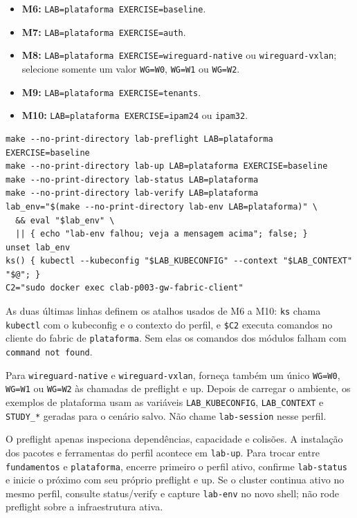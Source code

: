 \documentclass[12pt,openany,oneside,a4paper,chapter=TITLE,english,brazil]{abntex2}
\providecommand{\tightlist}{\setlength{\itemsep}{0pt}\setlength{\parskip}{0pt}}
\begin{document}
\begin{apendicesenv}
\begin{itemize}
\tightlist
\item
  \textbf{M6:} \texttt{LAB=\allowbreak{}plataforma EXERCISE=\allowbreak{}baseline}.
\item
  \textbf{M7:} \texttt{LAB=\allowbreak{}plataforma EXERCISE=\allowbreak{}auth}.
\item
  \textbf{M8:} \texttt{LAB=\allowbreak{}plataforma EXERCISE=\allowbreak{}wireguard-{}\allowbreak{}native} ou \texttt{wireguard-{}\allowbreak{}vxlan}; selecione somente um valor \texttt{WG=\allowbreak{}W0}, \texttt{WG=\allowbreak{}W1} ou \texttt{WG=\allowbreak{}W2}.
\item
  \textbf{M9:} \texttt{LAB=\allowbreak{}plataforma EXERCISE=\allowbreak{}tenants}.
\item
  \textbf{M10:} \texttt{LAB=\allowbreak{}plataforma EXERCISE=\allowbreak{}ipam24} ou \texttt{ipam32}.
\end{itemize}

\begin{verbatim}
make --no-print-directory lab-preflight LAB=plataforma EXERCISE=baseline
make --no-print-directory lab-up LAB=plataforma EXERCISE=baseline
make --no-print-directory lab-status LAB=plataforma
make --no-print-directory lab-verify LAB=plataforma
lab_env="$(make --no-print-directory lab-env LAB=plataforma)" \
  && eval "$lab_env" \
  || { echo "lab-env falhou; veja a mensagem acima"; false; }
unset lab_env
ks() { kubectl --kubeconfig "$LAB_KUBECONFIG" --context "$LAB_CONTEXT" "$@"; }
C2="sudo docker exec clab-p003-gw-fabric-client"
\end{verbatim}

As duas últimas linhas definem os atalhos usados de M6 a M10: \texttt{ks} chama
\texttt{kubectl} com o kubeconfig e o contexto do perfil, e \texttt{\$C2} executa comandos no
cliente do fabric de \texttt{plataforma}. Sem elas os comandos dos módulos falham com
\texttt{command not found}.

Para \texttt{wireguard-{}\allowbreak{}native} e \texttt{wireguard-{}\allowbreak{}vxlan}, forneça também um único \texttt{WG=\allowbreak{}W0},
\texttt{WG=\allowbreak{}W1} ou \texttt{WG=\allowbreak{}W2} às chamadas de preflight e up. Depois de carregar o
ambiente, os exemplos de plataforma usam as variáveis \texttt{LAB\_\allowbreak{}KUBECONFIG},
\texttt{LAB\_\allowbreak{}CONTEXT} e \texttt{STUDY\_\allowbreak{}*} geradas para o cenário salvo. Não chame
\texttt{lab-{}\allowbreak{}session} nesse perfil.

O preflight apenas inspeciona dependências, capacidade e colisões. A instalação
dos pacotes e ferramentas do perfil acontece em \texttt{lab-{}\allowbreak{}up}. Para trocar entre
\texttt{fundamentos} e \texttt{plataforma}, encerre primeiro o perfil ativo, confirme
\texttt{lab-{}\allowbreak{}status} e inicie o próximo com seu próprio preflight e up. Se o cluster
continua ativo no mesmo perfil, consulte status/verify e capture \texttt{lab-{}\allowbreak{}env} no
novo shell; não rode preflight sobre a infraestrutura ativa.


\end{apendicesenv}
\end{document}
